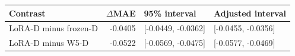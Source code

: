 
{\small\setlength{\tabcolsep}{4pt}
\begin{tabularx}{\textwidth}{Xrll}
\toprule
Contrast & $\Delta$MAE & 95\% interval & Adjusted interval \\
\midrule
LoRA-D minus frozen-D & -0.0405 & [-0.0449, -0.0362] & [-0.0455, -0.0356] \\
LoRA-D minus W5-D & -0.0522 & [-0.0569, -0.0475] & [-0.0577, -0.0469] \\
\bottomrule
\end{tabularx}}
